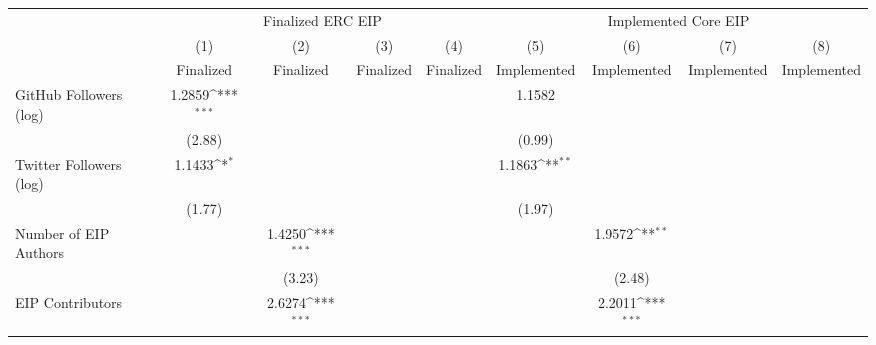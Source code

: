 {
\def\sym#1{\ifmmode^{#1}\else\(^{#1}\)\fi}
\begin{tabular}{l*{8}{c}}
\hline\hline
                                   &\multicolumn{4}{c}{Finalized ERC EIP}                                                  &\multicolumn{4}{c}{Implemented Core EIP}                                               \\\cmidrule(lr){2-5}\cmidrule(lr){6-9}
                                   &\multicolumn{1}{c}{(1)}         &\multicolumn{1}{c}{(2)}         &\multicolumn{1}{c}{(3)}         &\multicolumn{1}{c}{(4)}         &\multicolumn{1}{c}{(5)}         &\multicolumn{1}{c}{(6)}         &\multicolumn{1}{c}{(7)}         &\multicolumn{1}{c}{(8)}         \\
                                   &   Finalized         &   Finalized         &   Finalized         &   Finalized         & Implemented         & Implemented         & Implemented         & Implemented         \\
\hline
GitHub Followers (log)             &      1.2859\sym{***}&                     &                     &                     &      1.1582         &                     &                     &                     \\
                                   &      (2.88)         &                     &                     &                     &      (0.99)         &                     &                     &                     \\
[1em]
Twitter Followers (log)            &      1.1433\sym{*}  &                     &                     &                     &      1.1863\sym{**} &                     &                     &                     \\
                                   &      (1.77)         &                     &                     &                     &      (1.97)         &                     &                     &                     \\
[1em]
Number of EIP Authors              &                     &      1.4250\sym{***}&                     &                     &                     &      1.9572\sym{**} &                     &                     \\
                                   &                     &      (3.23)         &                     &                     &                     &      (2.48)         &                     &                     \\
[1em]
EIP Contributors                   &                     &      2.6274\sym{***}&                     &                     &                     &      2.2011\sym{***}&                     &                     \\

\end{tabular}}
